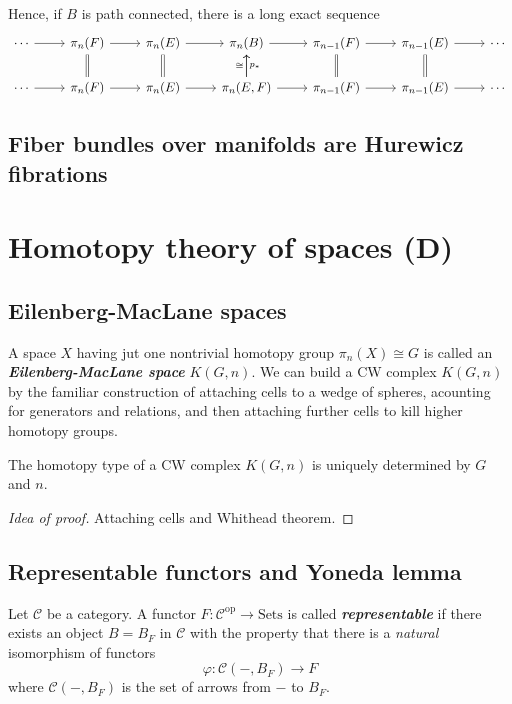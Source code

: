 \begin{remark}
\begin{definition}
\begin{thm}[Hatcher 4.41]
	Hence, if $B$ is path connected, there is a long exact sequence
\[\begin{tikzcd}
	\cdots\arrow[r]&\pi_n(F)\arrow[r]&\pi_n(E)\arrow[r]&\pi_n(B)\arrow[r]&\pi_{n-1}(F)\arrow[r]&\pi_{n-1}(E)\arrow[r]&\cdots\\
	\cdots\arrow[r]&\pi_n(F)\arrow[r]\arrow[u,equals]&\pi_n(E)\arrow[r]\arrow[u,equals]&\pi_n(E,F)\arrow[r]\arrow[u,"\cong "]\arrow[u,swap,"p_{*}"]&\pi_{n-1}(F)\arrow[r]\arrow[u,equals]&\pi_{n-1}(E)\arrow[r]\arrow[u,equals]&\cdots
\end{tikzcd}\]
\end{thm}

\subsection{Fiber bundles over manifolds are Hurewicz fibrations}

\section{Homotopy theory of spaces (D)}

\subsection{Eilenberg-MacLane spaces}
A space $X$ having jut one nontrivial homotopy group $\pi_{n}(X)\cong G$ is called an \textit{\textbf{Eilenberg-MacLane space}} $K(G,n)$. We can build a CW complex $K(G,n)$ by the familiar construction of attaching cells to a wedge of spheres, acounting for generators and relations, and then attaching further cells to kill higher homotopy groups.

\begin{prop}[4.30]
	The homotopy type of a CW complex $K(G,n)$ is uniquely determined by $G$ and $n$.
\end{prop}
\begin{proof}[Idea of proof]
	Attaching cells and Whithead theorem.
\end{proof}

\subsection{Representable functors and Yoneda lemma}

\begin{definition}
	Let $\mathcal{C}$ be a category. A functor $F:\mathcal{C}^{\text{op}}\to \text{Sets}$ is called \textit{\textbf{representable}} if there exists an object $B=B_{F}$ in $\mathcal{C}$ with the property that there is a \textit{natural} isomorphism of functors
	\[\varphi:\mathcal{C}(-,B_{F})\to F\]
	where $\mathcal{C}(-,B_{F})$ is the set of arrows from $-$ to $B_{F}$.


\end{definition}
\end{definition}
\end{remark}
